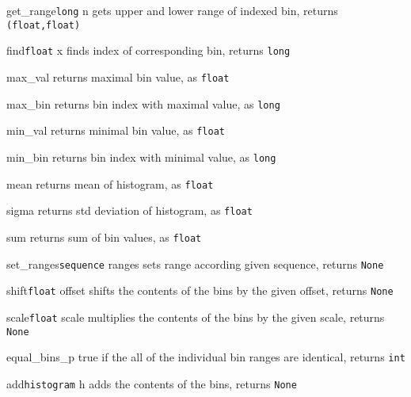 \begin{methoddesc}{get_range}{\texttt{long} n}
gets upper and lower range of indexed bin, \hfill returns \texttt{(float,float)}
\end{methoddesc}
\begin{methoddesc}{find}{\texttt{float} x}
finds index of corresponding bin, \hfill returns \texttt{long}
\end{methoddesc}
\begin{methoddesc}{max_val}{}
returns maximal bin value, \hfill as \texttt{float}
\end{methoddesc}
\begin{methoddesc}{max_bin}{}
returns bin index with maximal value, \hfill as \texttt{long}
\end{methoddesc}
\begin{methoddesc}{min_val}{}
returns minimal bin value, \hfill as \texttt{float}
\end{methoddesc}
\begin{methoddesc}{min_bin}{}
returns bin index with minimal value, \hfill as \texttt{long}
\end{methoddesc}
\begin{methoddesc}{mean}{}
returns mean of histogram, \hfill as \texttt{float}
\end{methoddesc}
\begin{methoddesc}{sigma}{}
returns std deviation of histogram, \hfill as \texttt{float}
\end{methoddesc}
\begin{methoddesc}{sum}{}
returns sum of bin values, \hfill as \texttt{float}
\end{methoddesc}
\begin{methoddesc}{set_ranges}{\texttt{sequence} ranges}
sets range according given sequence, \hfill returns \texttt{None}
\end{methoddesc}
\begin{methoddesc}{shift}{\texttt{float} offset}
shifts the contents of the bins by the given offset, \hfill returns
\texttt{None}
\end{methoddesc}
\begin{methoddesc}{scale}{\texttt{float} scale}
multiplies the contents of the bins by the given scale, \hfill returns \texttt{None}
\end{methoddesc}
\begin{methoddesc}{equal_bins_p}{}
true if the all of the individual bin ranges are identical, \hfill returns \texttt{int}
\end{methoddesc}
\begin{methoddesc}{add}{\texttt{histogram} h}
adds the contents of the bins, \hfill returns \texttt{None}
\end{methoddesc}
